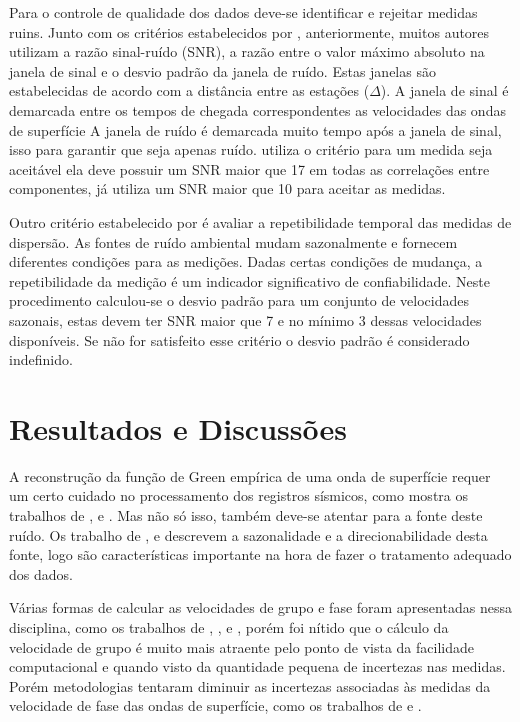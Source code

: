 \documentclass[paper,twocolumn]{geophysics}
\begin{document}
Para o controle de qualidade dos dados deve-se identificar e rejeitar medidas ruins. Junto com os critérios estabelecidos por \cite{bensen_processing_2007}, anteriormente, muitos autores utilizam a razão sinal-ruído (SNR), a razão entre o valor máximo absoluto na janela de sinal e o desvio padrão da janela de ruído. Estas janelas são estabelecidas de acordo com a distância entre as estações ($\Delta$). A janela de sinal é demarcada entre os tempos de chegada correspondentes as velocidades das ondas de superfície A janela de ruído é demarcada muito tempo após a janela de sinal, isso para garantir que seja apenas ruído.  \cite{lin_surface_2008} utiliza o critério para um medida seja aceitável ela deve possuir um SNR maior que 17 em todas as correlações entre componentes, já  \cite{bensen_processing_2007} utiliza um SNR maior que 10 para aceitar as medidas.

Outro critério estabelecido por \cite{bensen_processing_2007} é avaliar a repetibilidade temporal das medidas de dispersão. As fontes de ruído ambiental mudam sazonalmente e fornecem diferentes condições para as medições. Dadas certas condições de mudança, a repetibilidade da medição é um indicador significativo de confiabilidade. Neste procedimento calculou-se o desvio padrão para um conjunto de velocidades sazonais, estas devem ter SNR maior que 7 e no mínimo 3 dessas velocidades disponíveis. Se não for satisfeito esse critério o desvio padrão é considerado indefinido.

\section*{Resultados e Discussões}

A reconstrução da função de Green empírica de uma onda de superfície requer um certo cuidado no processamento dos registros sísmicos, como mostra os trabalhos de \cite{bensen_processing_2007}, \cite{lin_surface_2008} e \cite{ekstrom_determination_2009}. Mas não só isso, também deve-se atentar para a fonte deste ruído. Os trabalho de \cite{rhie_excitation_2004}, \cite{schulte-pelkum_strong_2004} e \cite{kedar_oceans_2005} descrevem a sazonalidade e a direcionabilidade desta fonte, logo são características importante na hora de fazer o tratamento adequado dos dados.

Várias formas de calcular as velocidades de grupo e fase foram apresentadas nessa disciplina, como os trabalhos de \cite{levshin_peculiarities_1992}, \cite{bensen_processing_2007}, \cite{lin_surface_2008} e \cite{ekstrom_determination_2009}, porém foi nítido que o cálculo da velocidade de grupo é muito mais atraente pelo ponto de vista da facilidade computacional e quando visto da quantidade pequena de incertezas nas medidas. Porém metodologias tentaram diminuir as incertezas associadas às medidas da velocidade de fase das ondas de superfície, como os trabalhos de \cite{lin_surface_2008} e \cite{ekstrom_determination_2009}.  
\end{document}
